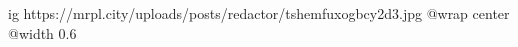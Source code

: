  
 
 
 
 

\ifcmt
  ig https://mrpl.city/uploads/posts/redactor/tshemfuxogbcy2d3.jpg
  @wrap center
  @width 0.6
\fi
